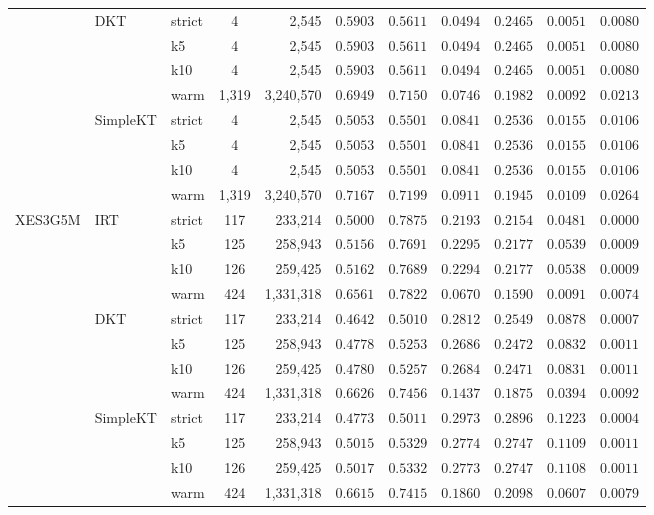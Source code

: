 \begin{tableorg}[htbp]
{\begin{tabular}{lllcrcccccc}
 & DKT & strict & 4 & 2,545 & $0.5903$ & $0.5611$ & $0.0494$ & $0.2465$ & $0.0051$ & $0.0080$ \\
 &  & k5 & 4 & 2,545 & $0.5903$ & $0.5611$ & $0.0494$ & $0.2465$ & $0.0051$ & $0.0080$ \\
 &  & k10 & 4 & 2,545 & $0.5903$ & $0.5611$ & $0.0494$ & $0.2465$ & $0.0051$ & $0.0080$ \\
 &  & warm & 1,319 & 3,240,570 & $0.6949$ & $0.7150$ & $0.0746$ & $0.1982$ & $0.0092$ & $0.0213$ \\
 & SimpleKT & strict & 4 & 2,545 & $0.5053$ & $0.5501$ & $0.0841$ & $0.2536$ & $0.0155$ & $0.0106$ \\
 &  & k5 & 4 & 2,545 & $0.5053$ & $0.5501$ & $0.0841$ & $0.2536$ & $0.0155$ & $0.0106$ \\
 &  & k10 & 4 & 2,545 & $0.5053$ & $0.5501$ & $0.0841$ & $0.2536$ & $0.0155$ & $0.0106$ \\
 &  & warm & 1,319 & 3,240,570 & $0.7167$ & $0.7199$ & $0.0911$ & $0.1945$ & $0.0109$ & $0.0264$ \\
\midrule
XES3G5M & IRT & strict & 117 & 233,214 & $0.5000$ & $0.7875$ & $0.2193$ & $0.2154$ & $0.0481$ & $0.0000$ \\
 &  & k5 & 125 & 258,943 & $0.5156$ & $0.7691$ & $0.2295$ & $0.2177$ & $0.0539$ & $0.0009$ \\
 &  & k10 & 126 & 259,425 & $0.5162$ & $0.7689$ & $0.2294$ & $0.2177$ & $0.0538$ & $0.0009$ \\
 &  & warm & 424 & 1,331,318 & $0.6561$ & $0.7822$ & $0.0670$ & $0.1590$ & $0.0091$ & $0.0074$ \\
 & DKT & strict & 117 & 233,214 & $0.4642$ & $0.5010$ & $0.2812$ & $0.2549$ & $0.0878$ & $0.0007$ \\
 &  & k5 & 125 & 258,943 & $0.4778$ & $0.5253$ & $0.2686$ & $0.2472$ & $0.0832$ & $0.0011$ \\
 &  & k10 & 126 & 259,425 & $0.4780$ & $0.5257$ & $0.2684$ & $0.2471$ & $0.0831$ & $0.0011$ \\
 &  & warm & 424 & 1,331,318 & $0.6626$ & $0.7456$ & $0.1437$ & $0.1875$ & $0.0394$ & $0.0092$ \\
 & SimpleKT & strict & 117 & 233,214 & $0.4773$ & $0.5011$ & $0.2973$ & $0.2896$ & $0.1223$ & $0.0004$ \\
 &  & k5 & 125 & 258,943 & $0.5015$ & $0.5329$ & $0.2774$ & $0.2747$ & $0.1109$ & $0.0011$ \\
 &  & k10 & 126 & 259,425 & $0.5017$ & $0.5332$ & $0.2773$ & $0.2747$ & $0.1108$ & $0.0011$ \\
 &  & warm & 424 & 1,331,318 & $0.6615$ & $0.7415$ & $0.1860$ & $0.2098$ & $0.0607$ & $0.0079$ \\
\bottomrule


\end{tabular}}
\end{tableorg}
